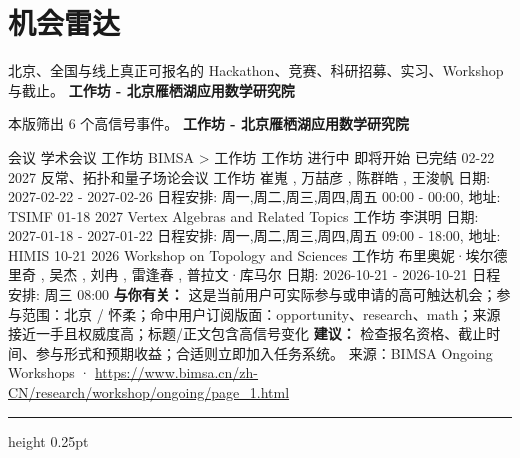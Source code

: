 \documentclass[10.5pt]{ctexart}
\begin{document}
\section*{机会雷达}
{\color{ormuted} 北京、全国与线上真正可报名的 Hackathon、竞赛、科研招募、实习、Workshop 与截止。}
\vspace{2mm}
{\LARGE\bfseries 工作坊 - 北京雁栖湖应用数学研究院}\par
\vspace{1mm}
{\color{ormuted} 本版筛出 6 个高信号事件。}
\vspace{3mm}
{\Large\bfseries 工作坊 - 北京雁栖湖应用数学研究院}\par
会议 学术会议 工作坊 BIMSA > 工作坊 工作坊 进行中 即将开始 已完结 02-22 2027 反常、拓扑和量子场论会议 工作坊 崔嵬 , 万喆彦 , 陈群皓 , 王浚帆 日期: 2027-02-22 - 2027-02-26 日程安排: 周一,周二,周三,周四,周五 00:00 - 00:00, 地址: TSIMF 01-18 2027 Vertex Algebras and Related Topics 工作坊 李淇明 日期: 2027-01-18 - 2027-01-22 日程安排: 周一,周二,周三,周四,周五 09:00 - 18:00, 地址: HIMIS 10-21 2026 Workshop on Topology and Sciences 工作坊 布里奥妮·埃尔德里奇 , 吴杰 , 刘冉 , 雷逢春 , 普拉文·库马尔 日期: 2026-10-21 - 2026-10-21 日程安排: 周三 08:00
\textbf{与你有关：} 这是当前用户可实际参与或申请的高可触达机会；参与范围：北京 / 怀柔；命中用户订阅版面：opportunity、research、math；来源接近一手且权威度高；标题/正文包含高信号变化
\textbf{建议：} 检查报名资格、截止时间、参与形式和预期收益；合适则立即加入任务系统。
{\footnotesize\color{ormuted} 来源：BIMSA Ongoing Workshops · \url{https://www.bimsa.cn/zh-CN/research/workshop/ongoing/page_1.html}}
\vspace{4mm}
\hrule height 0.25pt
\vspace{3mm}
\end{document}
